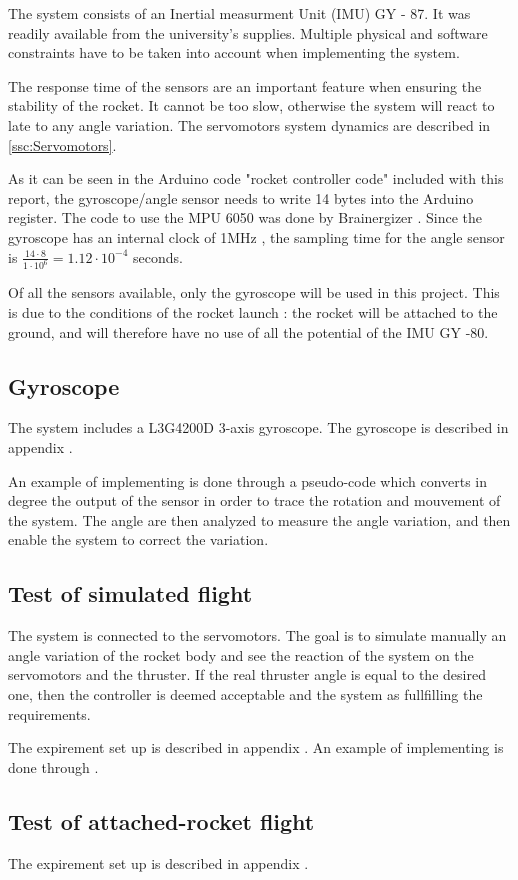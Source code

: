 The system consists of an Inertial measurment Unit (IMU) GY - 87. It was readily available from the university's supplies.
Multiple physical and software constraints have to be taken into account when implementing the system.

The response time of the sensors are an important feature when ensuring the stability of the rocket. It cannot be too slow, otherwise the system will react to late to any angle variation. The servomotors system dynamics are described in \autoref{ssc:Servomotors}.

As it can be seen in the Arduino code "rocket controller code" included with this report, the gyroscope/angle sensor needs to write 14 bytes into the Arduino register. The code to use the MPU 6050 was done by Brainergizer \cite{web:gyro_angle}. Since the gyroscope has an internal clock of 1MHz \cite{datasheet:MPU-6050}, the sampling time for the angle sensor is $\frac{14 \cdot 8}{1 \cdot 10^{6}} = 1.12 \cdot 10^{-4}$ seconds.

Of all the sensors available, only the gyroscope will be used in this project. This is due to the conditions of the rocket launch : the rocket will be attached to the ground, and will therefore have no use of all the potential of the IMU GY -80.

\subsection*{Gyroscope}

The system includes a L3G4200D 3-axis gyroscope. The gyroscope is described in appendix . 

An example of implementing is done through a pseudo-code which converts in degree the output of the sensor in order to trace the rotation and mouvement of the system. The angle are then analyzed to measure the angle variation, and then enable the system to correct the variation.

\subsection{Test of simulated flight}

The system is connected to the servomotors. The goal is to simulate manually an angle variation of the rocket body and see the reaction of the system on the servomotors and the thruster. If the real thruster angle is equal to the desired one, then the controller is deemed acceptable and the system as fullfilling the requirements.

The expirement set up is described in appendix . An example of implementing is done through 
.

\subsection{Test of attached-rocket flight}

The expirement set up is described in appendix . 